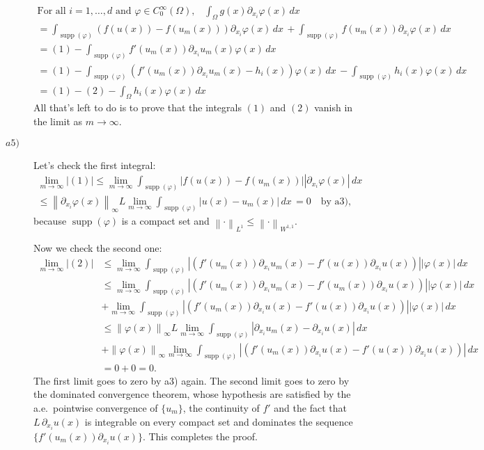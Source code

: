 \documentclass[a4paper]{article}
\DeclareMathOperator{\supp}{supp}
\newcommand{\abs}[1]{\left\lvert#1\right\rvert}
\newcommand{\dx}{\, dx \,}
\newcommand{\norm}[1]{\left\lVert#1\right\rVert}
\newcommand{\norminf}[1]{\left\lVert#1\right\rVert_\infty}
\begin{document}
\begin{description}
\begin{gather*}
	\text{For all $i = 1,\dots,d$ and $\varphi \in C^\infty_0(\Omega)$,} \quad
	\int_\Omega g(x) \partial_{x_i} \varphi(x) \dx \\
	= \int_{\supp(\varphi)} (f(u(x)) - f(u_m(x))) \partial_{x_i} \varphi(x) \dx 
	+ \int_{\supp(\varphi)} f(u_m(x)) \partial_{x_i} \varphi(x) \dx \\
	= (1) - \int_{\supp(\varphi)} f'(u_m(x)) \partial_{x_i} u_m(x) \varphi(x) \dx \\
	= (1) - \int_{\supp(\varphi)} (f'(u_m(x))\partial_{x_i}u_m(x) - h_i(x)) \varphi(x) \dx
	      - \int_{\supp(\varphi)} h_i(x) \varphi(x) \dx \\
	= (1) - (2) - \int_\Omega h_i(x) \varphi(x) \dx
	\end{gather*}
	All that's left to do is to prove that the integrals $(1)$ and $(2)$
	vanish in the limit as $m \to \infty$.
\item[$a5)$] Let's check the first integral:
	\begin{gather*}
	\lim_{m \to \infty} \abs{(1)}
	\leq \lim_{m \to \infty} \int_{\supp(\varphi)} \abs{f(u(x)) - f(u_m(x))}
	                         \abs{\partial_{x_i}\varphi(x)} \dx \\
	\leq \norminf{\partial_{x_i}\varphi(x)} L
	     \lim_{m \to \infty} \int_{\supp(\varphi)} \abs{u(x) - u_m(x)} \dx
	= 0 \quad \text{by a3),}
	\end{gather*}
	because $\supp(\varphi)$ is a compact set and
	$\norm{\cdot}_{L^1} \leq \norm{\cdot}_{W^{1,1}}$.
	
	Now we check the second one:
	\begin{align*}
	\lim_{m \to \infty} \abs{(2)}
	& \leq \lim_{m \to \infty} \int_{\supp(\varphi)}
	       \abs{(f'(u_m(x))\partial_{x_i}u_m(x) - f'(u(x))\partial_{x_i}u(x))}
	       \abs{\varphi(x)} \dx \\
	& \leq \lim_{m \to \infty} \int_{\supp(\varphi)}
	       \abs{(f'(u_m(x))\partial_{x_i}u_m(x) - f'(u_m(x))\partial_{x_i}u(x))}
	       \abs{\varphi(x)} \dx \\
	& +    \lim_{m \to \infty} \int_{\supp(\varphi)}
           \abs{(f'(u_m(x))\partial_{x_i}u(x) - f'(u(x))\partial_{x_i}u(x))}
	       \abs{\varphi(x)} \dx \\
	& \leq \norminf{\varphi(x)} L \lim_{m \to \infty} \int_{\supp(\varphi)}
	       \abs{\partial_{x_i}u_m(x) - \partial_{x_i}u(x)} \dx \\
	& +    \norminf{\varphi(x)} \lim_{m \to \infty} \int_{\supp(\varphi)}
           \abs{(f'(u_m(x))\partial_{x_i}u(x) - f'(u(x))\partial_{x_i}u(x))} \dx \\
    & = 0 + 0 = 0.
	\end{align*}
	The first limit goes to zero by a3) again.
	The second limit goes to zero by the dominated convergence theorem,
	whose hypothesis are satisfied by the a.e.\ pointwise convergence of $\{u_m\}$,
	the continuity of $f'$ and the fact that $L \, \partial_{x_i} u(x)$ is integrable
	on every compact set and dominates the sequence $\{f'(u_m(x))\partial_{x_i}u(x)\}$.
	This completes the proof.


\end{description}
\end{document}
